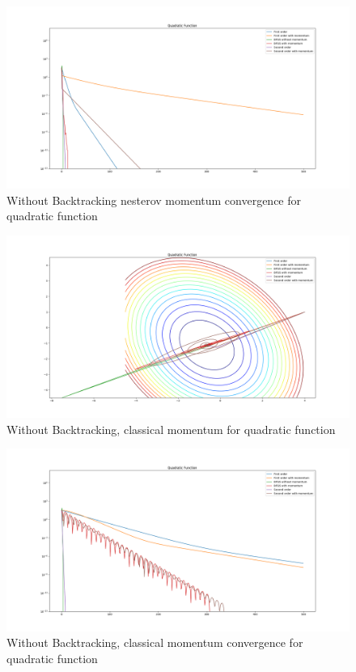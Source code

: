 \documentclass{article}
\begin{document}
\begin{figure}[H]
	\includegraphics[width=\linewidth]{../Images/quadraticnesterov1.png}
	\caption{Without Backtracking nesterov momentum convergence for quadratic function}
	\label{fig:Without Backtracking nesterov momentum convergence for quadratic function}
\end{figure}

\begin{figure}[H]
	\includegraphics[width=\linewidth]{../Images/quadraticmomentum.png}
	\caption{Without Backtracking, classical momentum for quadratic function}
	\label{fig:Without Backtracking, classical momentum for quadratic function}
\end{figure}

\begin{figure}[H]
	\includegraphics[width=\linewidth]{../Images/quadraticmomentum1.png}
	\caption{Without Backtracking, classical momentum convergence for quadratic function}
	\label{fig:Without Backtracking, classical momentum convergence for quadratic function}
\end{figure}
\end{document}
